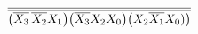 \documentclass[preview]{standalone}
\begin{document}
\begin{align*}
\overline{\overline{\left(\overline{X_3}\nobreak\hspace{.16667em plus .08333em}\overline{X_2}X_1\right)}\overline{\left(\overline{X_3}X_2X_0\right)}\overline{\left(X_2\overline{X_1}X_0)\right)}}
\end{align*}
\end{document}
